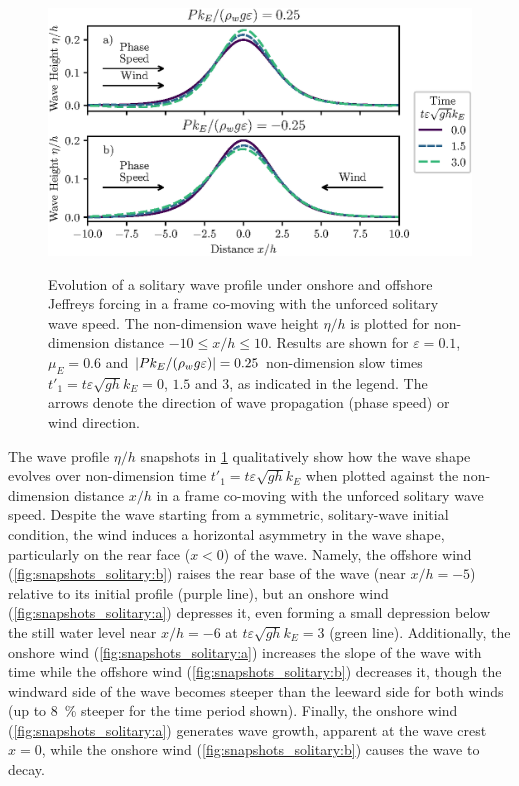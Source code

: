\documentclass{jfm}
\renewcommand*{\epsilon}{\varepsilon}
\begin{document}
\begin{figure}
  \centering
  { %
    \label{fig:snapshots_solitary:a}
    \label{fig:snapshots_solitary:b}
  }
  \includegraphics{Snapshots-Positive-Negative-Production.eps}
  \caption{
    Evolution of a solitary wave profile under
    onshore and
    offshore Jeffreys forcing in a frame co-moving with the unforced
    solitary wave speed.
    The non-dimension wave height $\eta/h$ is plotted for
    non-dimension distance $-10 \le x/h \le 10$.
    Results are shown for $\epsilon=0.1$, $\mu_E = 0.6$ and $\abs{P
    k_E/(\rho_w g \epsilon)} = 0.25$ non-dimension slow times $t'_1 = t
    \epsilon \sqrt{gh} k_E = 0$, $1.5$ and $3$, as indicated in the
    legend.
    The arrows denote the direction of wave propagation (phase speed) or
    wind direction.
  }\label{fig:snapshots_solitary}
\end{figure}

The wave profile $\eta/h$ snapshots in \cref{fig:snapshots_solitary}
qualitatively show how the wave shape evolves over non-dimension time
$t'_1 = t \epsilon \sqrt{g h} k_E$ when plotted against the
non-dimension distance $x/h$ in a frame co-moving with the unforced
solitary wave speed.
Despite the wave starting from a symmetric, solitary-wave initial
condition, the wind induces a horizontal asymmetry in the wave shape,
particularly on the rear face ($x<0$) of the wave.
Namely, the offshore wind (\cref{fig:snapshots_solitary:b}) raises the
rear base of the wave (near $x/h = -5$) relative to its initial profile
(purple line), but an onshore wind (\cref{fig:snapshots_solitary:a})
depresses it, even forming a small depression below the still water
level near $x/h = -6$ at $t\epsilon \sqrt{gh} k_E=3$ (green line).
Additionally, the onshore wind (\cref{fig:snapshots_solitary:a})
increases the slope of the wave with time while the offshore wind
(\cref{fig:snapshots_solitary:b}) decreases it, though the windward side
of the wave becomes steeper than the leeward side for both winds (up to
\SI{8}{\percent} steeper for the time period shown).
Finally, the onshore wind (\cref{fig:snapshots_solitary:a}) generates
wave growth, apparent at the wave crest $x=0$, while the onshore wind
(\cref{fig:snapshots_solitary:b}) causes the wave to decay.
\end{document}
